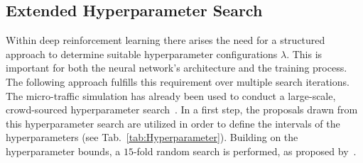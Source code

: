 \documentclass{article}
\begin{document}












\subsection{Extended Hyperparameter Search}
\label{ch:Hyperparametersearch}
Within deep reinforcement learning there arises the need for a structured approach to determine suitable hyperparameter configurations $\lambda$. This is important for both the neural network's architecture and the training process. The following approach fulfills this requirement over multiple search iterations. The micro-traffic simulation has already been used to conduct a large-scale, crowd-sourced hyperparameter search~\cite{FRIDMAN.2018}. In a first step, the proposals drawn from this hyperparameter search are utilized in order to define the intervals of the hyperparameters (see Tab.~\ref{tab:Hyperparameter}). Building on the hyperparameter bounds, a $15$-fold random search is performed, as proposed by~\cite{RANDOM.2012,GOODFELLOW.2016}.  
\end{document}
